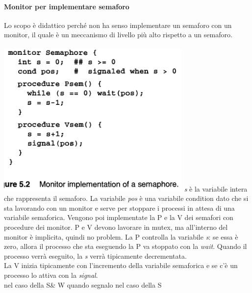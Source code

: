 \documentclass[10pt,a4paper]{book}
\begin{document}
\paragraph{Monitor per implementare semaforo}
Lo scopo è didattico perché non ha senso implementare un semaforo con un monitor, il quale è un meccanismo di livello più alto rispetto a un semaforo.\\ \\
\includegraphics[scale=0.51]{img/monsem.png} 
\textit{s} è la variabile intera che rappresenta il semaforo. La variabile \textit{pos} è una variabile condition dato che si sta lavorando con un monitor e serve per stoppare i processi in attesa di una variabile semaforica.
Vengono poi implementate la P e la V dei semafori con procedure dei monitor.
P e V devono lavorare in mutex, ma all'interno del monitor è implicita, quindi no problem.
La P controlla la variabile \textit{s}: se essa è zero, allora il processo che sta eseguendo la P va stoppato con la \textit{wait}. Quando il processo verrà eseguito, la \textit{s} verrà tipicamente decrementata.\\
La V inizia tipicamente con l'incremento della variabile semaforica e se c'è un processo lo attiva con la \textit{signal}.\\
nel caso della S\& W quando segnalo 
nel caso della S
\end{document}
